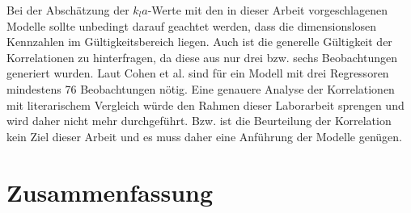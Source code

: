 \documentclass[12pt,liststotoc]{report}
\begin{document}
Bei der Abschätzung der $k_la$-Werte mit den in dieser Arbeit vorgeschlagenen Modelle sollte unbedingt darauf geachtet werden, dass die dimensionslosen Kennzahlen im Gültigkeitsbereich liegen. Auch ist die generelle Gültigkeit der Korrelationen zu hinterfragen, da diese aus nur drei bzw. sechs Beobachtungen generiert wurden. Laut Cohen et al. \cite{regression} sind für ein Modell mit drei Regressoren mindestens 76 Beobachtungen nötig. Eine genauere Analyse der Korrelationen mit literarischem Vergleich würde den Rahmen dieser Laborarbeit sprengen und wird daher nicht mehr durchgeführt. Bzw. ist die Beurteilung der Korrelation kein Ziel dieser Arbeit und es muss daher eine Anführung der Modelle genügen.

\chapter{Zusammenfassung}
\end{document}
